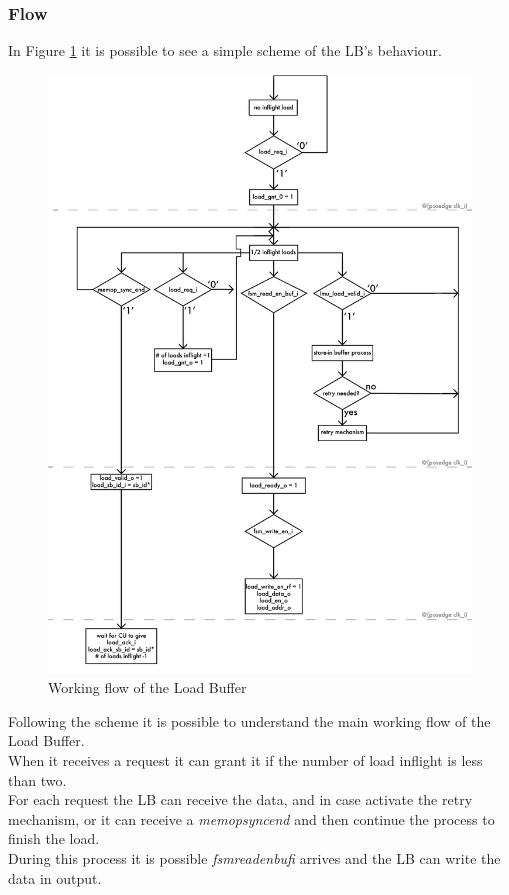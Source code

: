 \subsubsection{Flow}
In Figure \ref{lb-flow} it is possible to see a simple scheme of the LB's behaviour.

\newpage
\begin{figure}[H]
    \centering
    \includegraphics[scale = 0.8]{Chapter_2/img/lb-flow.png}
    \caption{Working flow of the Load Buffer}
    \label{lb-flow}
\end{figure}

Following the scheme it is possible to understand the main working flow of the Load Buffer.\\
When it receives a request it can grant it if the number of load inflight is less than two.\\
For each request the LB can receive the data, and in case activate the retry mechanism, or it can receive a \emph{memop\+sync\+end} and then continue the process to finish the load.\\
During this process it is possible \emph{fsm\+read\+en\+buf\+i} arrives and the LB can write the data in output.\\


